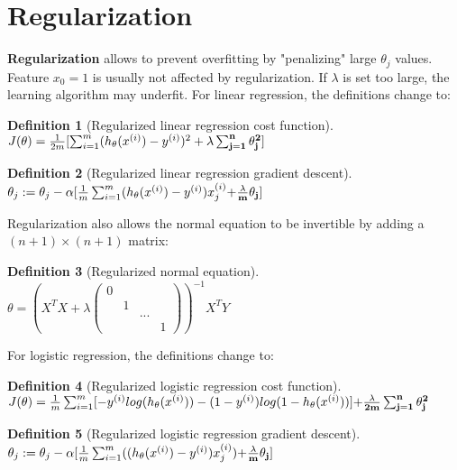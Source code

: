 \documentclass{report}
\newtheorem{definition}{Definition}[section]
\begin{document}
\section{Regularization}
{\bf Regularization} allows to prevent overfitting by "penalizing" large $\theta_j$ values. Feature $x_0=1$ is usually not affected by regularization. If $\lambda$ is set too large, the learning algorithm may underfit. For linear regression, the definitions change to:

\begin{definition}[Regularized linear regression cost function] ~\\
$J(\theta) = \frac{1}{2m}[\sum_{i=1}^m(h_\theta(x^{(i)})-y^{(i)})^2+ {\bf \lambda \sum_{j=1}^n\theta_j^2}]$
\end{definition}

\begin{definition}[Regularized linear regression gradient descent] ~\\
$\theta_j := \theta_j - \alpha[ \frac{1}{m}\sum_{i=1}^m(h_\theta(x^{(i)})-y^{(i)})x_j^{(i)} {\bf +\frac{\lambda}{m}\theta_j}]$
\end{definition}

Regularization also allows the normal equation to be invertible by adding a $(n+1)\times (n+1)$ matrix:
\begin{definition}[Regularized normal equation] ~\\
$\theta = (X^{T}X+\lambda
\begin{pmatrix}
0 & & & \\
&1& &\\
& & ... & \\
& & & 1
\end{pmatrix}
)^{-1}X^{T}Y$
\end{definition}

For logistic regression, the definitions change to:

\begin{definition}[Regularized logistic regression cost function] ~\\
$J(\theta) = \frac{1}{m}\sum_{i=1}^m[-y^{(i)}log(h_{\theta}(x^{(i)}))-(1-y^{(i)})log(1-h_{\theta}(x^{(i)}))] {\bf + \frac{\lambda}{2m}\sum_{j=1}^n\theta_j^2}$
\end{definition}

\begin{definition}[Regularized logistic regression gradient descent] ~\\
$\theta_j := \theta_j - \alpha[ \frac{1}{m}\sum_{i=1}^m((h_\theta(x^{(i)})-y^{(i)})x_j^{(i)} ) {\bf + \frac{\lambda}{m}\theta_j}]$
\end{definition}
\end{document}
